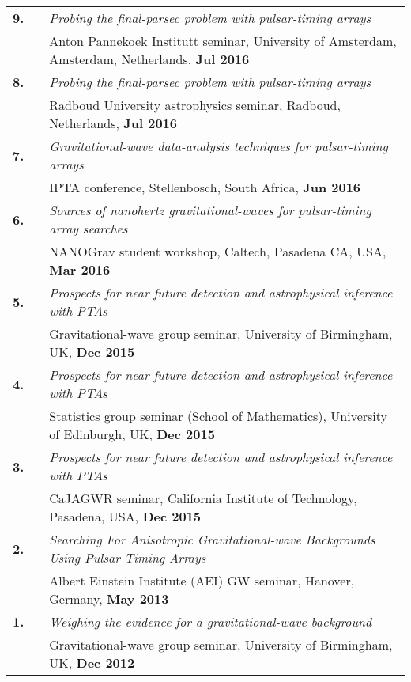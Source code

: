 \documentclass[11pt,letterpaper,sans]{moderncv}
\begin{document}
{\begin{longtable}{rp{0.3cm}p{15.8cm}}
\textbf{9.} & & \textit{Probing the final-parsec problem with pulsar-timing arrays} \\ 
&& Anton Pannekoek Institutt seminar, University of Amsterdam, Amsterdam, Netherlands, \textbf{Jul 2016} \vspace{0.09cm}\\
\textbf{8.} & & \textit{Probing the final-parsec problem with pulsar-timing arrays} \\ 
&& Radboud University astrophysics seminar, Radboud, Netherlands, \textbf{Jul 2016} \vspace{0.09cm}\\
\textbf{7.} & & \textit{Gravitational-wave data-analysis techniques for pulsar-timing arrays} \\ 
&& IPTA conference, Stellenbosch, South Africa, \textbf{Jun 2016} \vspace{0.09cm}\\
\textbf{6.} & & \textit{Sources of nanohertz gravitational-waves for pulsar-timing array searches} \\ 
&& NANOGrav student workshop, Caltech, Pasadena CA, USA, \textbf{Mar 2016} \vspace{0.09cm}\\
\textbf{5.} & & \textit{Prospects for near future detection and astrophysical inference with PTAs} \\ 
&& Gravitational-wave group seminar, University of Birmingham, UK, \textbf{Dec 2015} \vspace{0.09cm}\\
\textbf{4.} & & \textit{Prospects for near future detection and astrophysical inference with PTAs} \\ 
&& Statistics group seminar (School of Mathematics), University of Edinburgh, UK, \textbf{Dec 2015} \vspace{0.09cm}\\
\textbf{3.} & & \textit{Prospects for near future detection and astrophysical inference with PTAs} \\ 
&& CaJAGWR seminar, California Institute of Technology, Pasadena, USA, \textbf{Dec 2015} \vspace{0.09cm}\\
\textbf{2.} & & \textit{Searching For Anisotropic Gravitational-wave Backgrounds Using Pulsar Timing Arrays} \\ 
&& Albert Einstein Institute (AEI) GW seminar, Hanover, Germany, \textbf{May 2013} \vspace{0.09cm}\\
\textbf{1.} & & \textit{Weighing the evidence for a gravitational-wave background} \\ 
&& Gravitational-wave group seminar, University of Birmingham, UK, \textbf{Dec 2012} 
\end{longtable}
}
\end{document}
